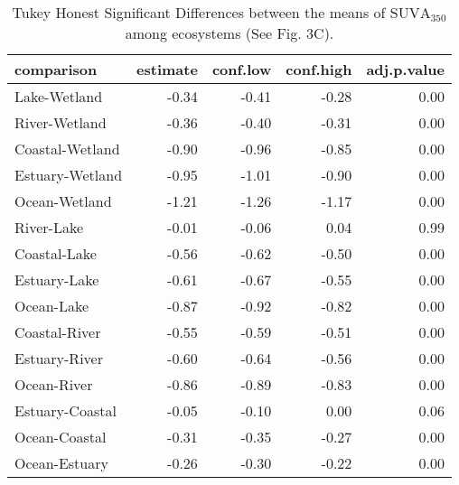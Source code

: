 \begin{table}[ht]
\centering
\begin{tabular}{lrrrr}
  \hline
comparison & estimate & conf.low & conf.high & adj.p.value \\ 
  \hline
Lake-Wetland & -0.34 & -0.41 & -0.28 & 0.00 \\ 
  River-Wetland & -0.36 & -0.40 & -0.31 & 0.00 \\ 
  Coastal-Wetland & -0.90 & -0.96 & -0.85 & 0.00 \\ 
  Estuary-Wetland & -0.95 & -1.01 & -0.90 & 0.00 \\ 
  Ocean-Wetland & -1.21 & -1.26 & -1.17 & 0.00 \\ 
  River-Lake & -0.01 & -0.06 & 0.04 & 0.99 \\ 
  Coastal-Lake & -0.56 & -0.62 & -0.50 & 0.00 \\ 
  Estuary-Lake & -0.61 & -0.67 & -0.55 & 0.00 \\ 
  Ocean-Lake & -0.87 & -0.92 & -0.82 & 0.00 \\ 
  Coastal-River & -0.55 & -0.59 & -0.51 & 0.00 \\ 
  Estuary-River & -0.60 & -0.64 & -0.56 & 0.00 \\ 
  Ocean-River & -0.86 & -0.89 & -0.83 & 0.00 \\ 
  Estuary-Coastal & -0.05 & -0.10 & 0.00 & 0.06 \\ 
  Ocean-Coastal & -0.31 & -0.35 & -0.27 & 0.00 \\ 
  Ocean-Estuary & -0.26 & -0.30 & -0.22 & 0.00 \\ 
   \hline
\end{tabular}
\caption{Tukey Honest Significant Differences between the means of $\text{SUVA}_{350}$ among ecosystems (See Fig. 3C).} 
\end{table}
